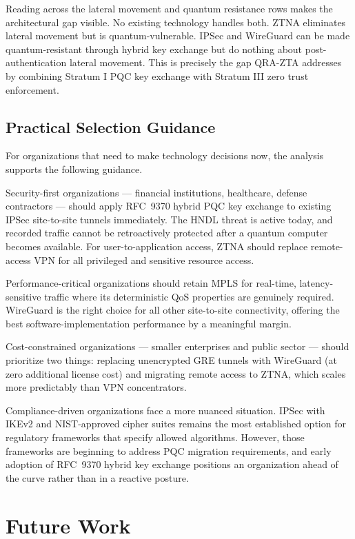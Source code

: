 \documentclass[conference]{IEEEtran}
\begin{document}
Reading across the lateral movement and quantum resistance rows
makes the architectural gap visible. No existing technology
handles both. ZTNA eliminates lateral movement but is
quantum-vulnerable. IPSec and WireGuard can be made
quantum-resistant through hybrid key exchange but do nothing
about post-authentication lateral movement. This is precisely
the gap QRA-ZTA addresses by combining Stratum I PQC key
exchange with Stratum III zero trust enforcement.

\subsection{Practical Selection Guidance}

For organizations that need to make technology decisions now,
the analysis supports the following guidance.

Security-first organizations --- financial institutions, healthcare,
defense contractors --- should apply RFC~9370 hybrid PQC key
exchange to existing IPSec site-to-site tunnels immediately.
The HNDL threat is active today, and recorded traffic cannot
be retroactively protected after a quantum computer becomes
available. For user-to-application access, ZTNA should replace
remote-access VPN for all privileged and sensitive resource access.

Performance-critical organizations should retain MPLS for
real-time, latency-sensitive traffic where its deterministic
QoS properties are genuinely required. WireGuard is the right
choice for all other site-to-site connectivity, offering the
best software-implementation performance by a meaningful margin.

Cost-constrained organizations --- smaller enterprises and
public sector --- should prioritize two things: replacing
unencrypted GRE tunnels with WireGuard (at zero additional
license cost) and migrating remote access to ZTNA, which
scales more predictably than VPN concentrators.

Compliance-driven organizations face a more nuanced situation.
IPSec with IKEv2 and NIST-approved cipher suites remains the
most established option for regulatory frameworks that specify
allowed algorithms. However, those frameworks are beginning
to address PQC migration requirements, and early adoption of
RFC~9370 hybrid key exchange positions an organization ahead
of the curve rather than in a reactive posture.

\section{Future Work}
\end{document}
